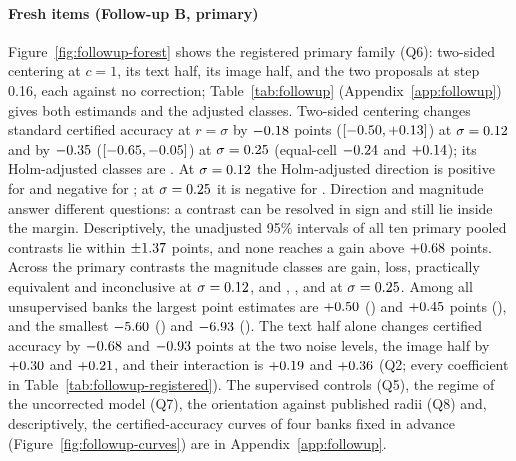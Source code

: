 \paragraph{Fresh items (Follow-up B, primary)}
Figure~\ref{fig:followup-forest} shows the registered primary family (Q6):
two-sided centering at $c=1$, its text half, its image half, and the two
proposals at step 0.16, each against no correction; Table~\ref{tab:followup}
(Appendix~\ref{app:followup}) gives both estimands and the adjusted classes.
Two-sided centering changes standard certified accuracy at $r=\sigma$ by
$-0.18$ points ($[-0.50,+0.13]$) at
$\sigma=0.12$ and by $-0.35$ ($[-0.65,-0.05]$)
at $\sigma=0.25$ (equal-cell $-0.24$ and
$+0.14$); its Holm-adjusted classes are \FUGRClasses{}. At
$\sigma=0.12$ the Holm-adjusted direction is positive for
\FUQSixLowPositiveIds{} and negative for \FUQSixLowNegativeIds{}; at
$\sigma=0.25$ it is negative for \FUQSixHighNegativeIds{}. Direction
and magnitude answer different questions: a contrast can be resolved in sign
and still lie inside the margin. Descriptively, the unadjusted 95\% intervals of
all ten primary pooled contrasts lie within $\pm1.37$ points,
and none reaches a gain above $+0.68$ points. Across the \FUQSixLowN{} primary contrasts the magnitude
classes are \FUQSixLowGain{} gain, \FUQSixLowLoss{} loss, \FUQSixLowEquiv{}
practically equivalent and \FUQSixLowIncon{} inconclusive at
$\sigma=0.12$, and \FUQSixHighGain{}, \FUQSixHighLoss{},
\FUQSixHighEquiv{} and \FUQSixHighIncon{} at $\sigma=0.25$. Among all
unsupervised banks the largest point estimates are $+0.50$
(\FUQSixLowMaxId) and $+0.45$ points (\FUQSixHighMaxId), and the
smallest $-5.60$ (\FUQSixLowMinId) and $-6.93$
(\FUQSixHighMinId). The text half alone changes certified accuracy by
$-0.68$ and $-0.93$ points at the two noise levels, the
image half by $+0.30$ and $+0.21$, and their interaction
is $+0.19$ and $+0.36$ (Q2; every coefficient in
Table~\ref{tab:followup-registered}). The supervised controls (Q5), the regime
of the uncorrected model (Q7), the orientation against published radii (Q8)
and, descriptively, the certified-accuracy curves of four banks fixed in
advance (Figure~\ref{fig:followup-curves}) are in Appendix~\ref{app:followup}.

